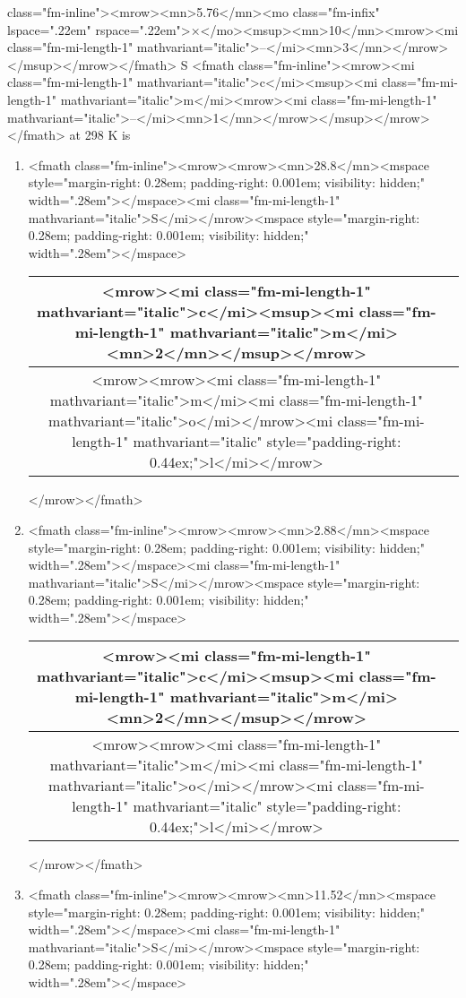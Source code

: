 \documentclass{article}
\begin{document}
class="fm-inline"><mrow><mn>5.76</mn><mo class="fm-infix" lspace=".22em" rspace=".22em">×</mo><msup><mn>10</mn><mrow><mi class="fm-mi-length-1" mathvariant="italic">–</mi><mn>3</mn></mrow></msup></mrow></fmath> S <fmath class="fm-inline"><mrow><mi class="fm-mi-length-1" mathvariant="italic">c</mi><msup><mi class="fm-mi-length-1" mathvariant="italic">m</mi><mrow><mi class="fm-mi-length-1" mathvariant="italic">–</mi><mn>1</mn></mrow></msup></mrow></fmath> at 298 K is 
\begin{enumerate}[label=(\alph*)]
\item  <fmath class="fm-inline"><mrow><mrow><mn>28.8</mn><mspace style="margin-right: 0.28em; padding-right: 0.001em; visibility: hidden;" width=".28em">‌</mspace><mi class="fm-mi-length-1" mathvariant="italic">S</mi></mrow><mspace style="margin-right: 0.28em; padding-right: 0.001em; visibility: hidden;" width=".28em">‌</mspace>\begin{tabular}{|c|c|}
\hline
<mrow><mi class="fm-mi-length-1" mathvariant="italic">c</mi><msup><mi class="fm-mi-length-1" mathvariant="italic">m</mi><mn>2</mn></msup></mrow> \\
\hline
<mrow><mrow><mi class="fm-mi-length-1" mathvariant="italic">m</mi><mi class="fm-mi-length-1" mathvariant="italic">o</mi></mrow><mi class="fm-mi-length-1" mathvariant="italic" style="padding-right: 0.44ex;">l</mi></mrow> \\
\hline
\end{tabular}
</mrow></fmath>
\item  <fmath class="fm-inline"><mrow><mrow><mn>2.88</mn><mspace style="margin-right: 0.28em; padding-right: 0.001em; visibility: hidden;" width=".28em">‌</mspace><mi class="fm-mi-length-1" mathvariant="italic">S</mi></mrow><mspace style="margin-right: 0.28em; padding-right: 0.001em; visibility: hidden;" width=".28em">‌</mspace>\begin{tabular}{|c|c|}
\hline
<mrow><mi class="fm-mi-length-1" mathvariant="italic">c</mi><msup><mi class="fm-mi-length-1" mathvariant="italic">m</mi><mn>2</mn></msup></mrow> \\
\hline
<mrow><mrow><mi class="fm-mi-length-1" mathvariant="italic">m</mi><mi class="fm-mi-length-1" mathvariant="italic">o</mi></mrow><mi class="fm-mi-length-1" mathvariant="italic" style="padding-right: 0.44ex;">l</mi></mrow> \\
\hline
\end{tabular}
</mrow></fmath>
\item  <fmath class="fm-inline"><mrow><mrow><mn>11.52</mn><mspace style="margin-right: 0.28em; padding-right: 0.001em; visibility: hidden;" width=".28em">‌</mspace><mi class="fm-mi-length-1" mathvariant="italic">S</mi></mrow><mspace style="margin-right: 0.28em; padding-right: 0.001em; visibility: hidden;" width=".28em">‌</mspace>\begin{tabular}{|c|c|}

\end{tabular}
\end{enumerate}
\end{document}
